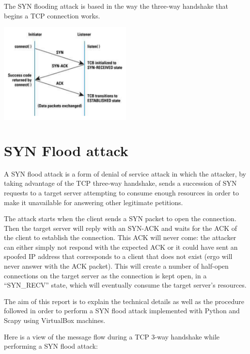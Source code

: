 \documentclass[11pt]{article}
\begin{document}
The SYN flooding attack is based in the way the three-way handshake that begins a TCP connection works.

\begin{center}
\vfill\vfill
\includegraphics[width=0.5\textwidth]{3wayhandshake.png}\\[1cm]
\end{center}

\section{SYN Flood attack}\index{}
A SYN flood attack is a form of denial of service attack in which the attacker, by taking advantage of the TCP three-way handshake, sends a succession of SYN requests to a target server attempting to consume enough resources in order to make it unavailable for answering other legitimate petitions.\vspace{5mm}

The attack starts when the client sends a SYN packet to open the connection. Then the target server will reply with an SYN-ACK and waits for the ACK of the client to establish the connection. This ACK will never come: the attacker can either simply not respond with the expected ACK or it could have sent an spoofed IP address that corresponds to a client that does not exist (ergo will never answer with the ACK packet). This will create a number of half-open connections on the target server as the connection is kept open, in a “SYN\_RECV” state, which will eventually consume the target server's resources.\vspace{5mm}

The aim of this report is to explain the technical details as well as the procedure followed in order to perform a SYN flood attack implemented with Python and Scapy using VirtualBox machines.\vspace{5mm}

Here is a view of the message flow during a TCP 3-way handshake while performing a SYN flood attack:
\end{document}
